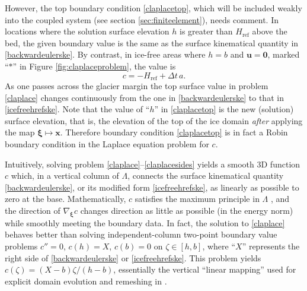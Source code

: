 \documentclass[letterpaper,final,12pt,reqno]{amsart}
\newcommand{\grad}{\nabla}
\newcommand{\bu}{\mathbf{u}}
\newcommand{\bx}{\mathbf{x}}
\newcommand{\bxi}{\bm{\xi}}
\newcommand{\bzero}{\bm{0}}
\newcommand{\Href}{H_{\text{ref}}}
\begin{document}
However, the top boundary condition \eqref{claplacetop}, which will be included weakly into the coupled system (see section \ref{sec:finiteelement}), needs comment.  In locations where the solution surface elevation $h$ is greater than $\Href$ above the bed, the given boundary value is the same as the surface kinematical quantity in \eqref{backwardeulerske}.  By contrast, in ice-free areas where $h=b$ and $\bu=\bzero$, marked ``$\ast$'' in Figure \ref{fig:claplaceproblem}, the value is
\begin{equation}
    c = - \Href + \Delta t\,a. \label{icefreehrefske}
\end{equation}
As one passes across the glacier margin the top surface value in problem \eqref{claplace} changes continuously from the one in \eqref{backwardeulerske} to that in \eqref{icefreehrefske}.  Note that the value of ``$h$'' in \eqref{claplacetop} is the new (solution) surface elevation, that is, the elevation of the top of the ice domain \emph{after} applying the map $\bxi\mapsto \bx$.    Therefore boundary condition \eqref{claplacetop} is in fact a Robin boundary condition in the Laplace equation problem for $c$.

Intuitively, solving problem \eqref{claplace}--\eqref{claplacesides} yields a smooth 3D function $c$ which, in a vertical column of $\Lambda$, connects the surface kinematical quantity \eqref{backwardeulerske}, or its modified form \eqref{icefreehrefske}, as linearly as possible to zero at the base.  Mathematically, $c$ satisfies the maximum principle in $\Lambda$ \cite{Evans2010}, and the direction of $\grad_{\bxi} c$ changes direction as little as possible (in the energy norm) while smoothly meeting the boundary data.  In fact, the solution to \eqref{claplace} behaves better than solving independent-column two-point boundary value problems $c''=0$, $c(h)=X$, $c(b)=0$ on $\zeta\in[h,b]$, where ``$X$'' represents the right side of \eqref{backwardeulerske} or \eqref{icefreehrefske}.  This problem yields $c(\zeta)=(X-b)\zeta/(h-b)$, essentially the vertical ``linear mapping'' used for explicit domain evolution and remeshing in \cite[equation (22)]{Lengetal2012}.
\end{document}

